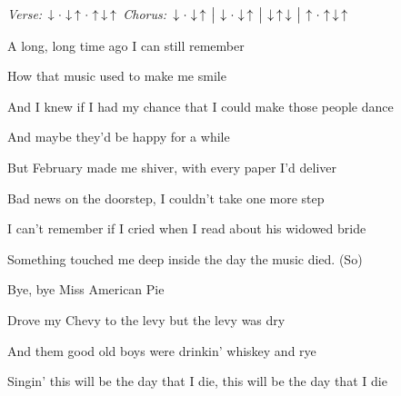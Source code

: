 \begin{song}


\textit{Verse:} $\Down\Miss\Down\Up\Miss\Up\Down\Up$ \quad
\textit{Chorus:} $\Down\Miss\Down\Up \Separator \Down\Miss\Down\Up \Separator \Down\Up\Down \Separator \Up\Miss\Up\Down\Up$ \quad

\large

\begin{chordbox}
{} \par
{} \par
{} \par
{} \par
{} \par
\end{chordbox}

\normalsize

\bigskip

 \par
A long, long time ago  I can still remember \par
How that music used to make me smile \par
And I knew if I had my chance that I could make those people dance \par
And maybe they'd be happy for a while \par

\bigskip

But February made me shiver, with every paper I'd deliver \par
{}Bad news on the doorstep, I couldn't take one more step \par
I can't remember if I cried when I read about his widowed bride \par
{}Something touched me deep inside the day the music died. (So) \par

\bigskip

\begin{chorusbox}{\Chorus}
Bye, bye Miss American Pie \par
Drove my Chevy to the levy but the levy was dry \par
And them good old boys were drinkin' whiskey and rye \par
Singin' this will be the day that I die, this will be the day that I die \par
\end{chorusbox}


\end{song}
